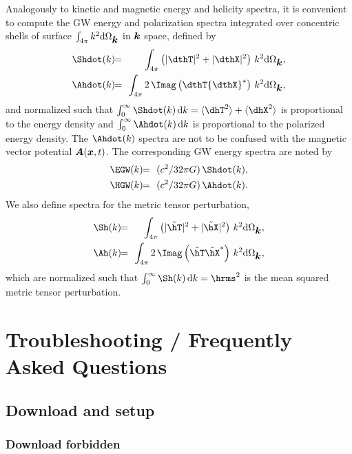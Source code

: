 \documentclass[\mydriver,12pt,twoside,notitlepage,a4paper]{article}
\renewcommand{\vec}[1]{\mbox{\boldmath{$#1$}}}
\newcommand{\Av}            {\vec{A}}
\newcommand{\kv}            {\vec{k}}
\newcommand{\xv}            {\vec{x}}
\newcommand{\bra}[1]{\langle #1\rangle}
\newcommand{\dd}{{\rm d} {}}
\begin{document}
Analogously to kinetic and magnetic energy and helicity spectra, it is
convenient to compute the GW energy and polarization spectra integrated
over concentric shells of surface $\int_{4\pi}k^2\dd\Omega_{\kv}$ in $\kv$
space, defined by
\begin{eqnarray}
\Shdot(k)\!\!&=&\!\!\int_{4\pi}\left(|\dthT|^2+|\dthX|^2\right)\,k^2\dd\Omega_{\kv},\\
\Ahdot(k)\!\!&=&\!\!\int_{4\pi}2\,\Imag\left(\dthT{{\dthX}}^\ast\right)\,k^2\dd\Omega_{\kv},
\end{eqnarray}
and normalized such that $\int_0^\infty\Shdot(k)\,\dd k=\bra{\dhT^2}+\bra{\dhX^2}$
is proportional to the energy density and $\int_0^\infty \Ahdot(k)\,\dd k$
is proportional to the polarized energy density.
The $\Ahdot(k)$ spectra are not to be confused with the magnetic vector
potential $\Av(\xv,t)$.
The corresponding GW energy spectra are noted by
\begin{eqnarray}
\EGW(k)\!\!&=&\!\!(c^2/32\pi G)\,\Shdot(k),\\
\HGW(k)\!\!&=&\!\!(c^2/32\pi G)\,\Ahdot(k).
\end{eqnarray}
We also define spectra for the metric tensor perturbation,
\begin{eqnarray}
\Sh(k)\!\!&=&\!\!\int_{4\pi}\left(|\tilde\hT|^2+|\tilde\hX|^2\right)\,k^2\dd\Omega_{\kv},\\
\Ah(k)\!\!&=&\!\!\int_{4\pi}2\,\Imag\left(\tilde\hT\tilde\hX^\ast\right)\,k^2\dd\Omega_{\kv},
\end{eqnarray}
which are normalized such that $\int_0^\infty\Sh(k)\,\dd k=\hrms^2$ is the
mean squared metric tensor perturbation.


\section{Troubleshooting / Frequently Asked Questions}
\label{FAQ}

\subsection{Download and setup}

\subsubsection{Download forbidden}
\end{document}

